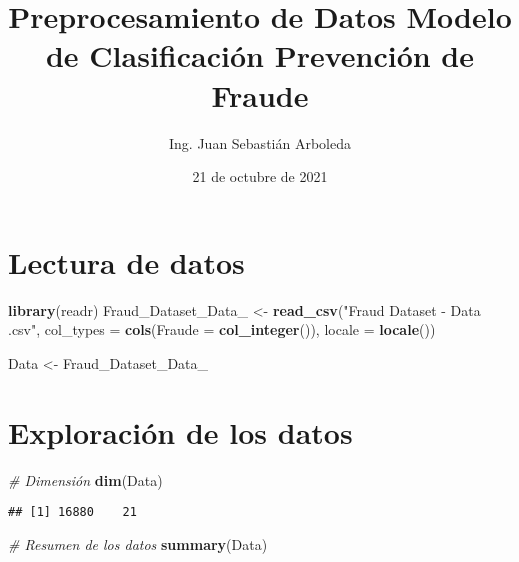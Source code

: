 \documentclass[]{article}
\title{Preprocesamiento de Datos Modelo de Clasificación Prevención de Fraude}
\author{Ing. Juan Sebastián Arboleda}
\date{21 de octubre de 2021}
\newenvironment{Shaded}{\begin{snugshade}}{\end{snugshade}}
\newcommand{\CommentTok}[1]{\textcolor[rgb]{0.56,0.35,0.01}{\textit{#1}}}
\newcommand{\DataTypeTok}[1]{\textcolor[rgb]{0.13,0.29,0.53}{#1}}
\newcommand{\KeywordTok}[1]{\textcolor[rgb]{0.13,0.29,0.53}{\textbf{#1}}}
\newcommand{\NormalTok}[1]{#1}
\newcommand{\StringTok}[1]{\textcolor[rgb]{0.31,0.60,0.02}{#1}}
\begin{document}
\maketitle

\hypertarget{lectura-de-datos}{%
\section{Lectura de datos}\label{lectura-de-datos}}

\begin{Shaded}
\begin{Highlighting}[]
\KeywordTok{library}\NormalTok{(readr)}
\NormalTok{Fraud_Dataset_Data_ <-}\StringTok{ }\KeywordTok{read_csv}\NormalTok{(}\StringTok{"Fraud Dataset  - Data .csv"}\NormalTok{, }
    \DataTypeTok{col_types =} \KeywordTok{cols}\NormalTok{(}\DataTypeTok{Fraude =} \KeywordTok{col_integer}\NormalTok{()), }
    \DataTypeTok{locale =} \KeywordTok{locale}\NormalTok{())}

\NormalTok{Data <-}\StringTok{ }\NormalTok{Fraud_Dataset_Data_}
\end{Highlighting}
\end{Shaded}

\hypertarget{exploraciuxf3n-de-los-datos}{%
\section{Exploración de los datos}\label{exploraciuxf3n-de-los-datos}}

\begin{Shaded}
\begin{Highlighting}[]
\CommentTok{# Dimensión}
\KeywordTok{dim}\NormalTok{(Data)}
\end{Highlighting}
\end{Shaded}

\begin{verbatim}
## [1] 16880    21
\end{verbatim}

\begin{Shaded}
\begin{Highlighting}[]
\CommentTok{# Resumen de los datos}
\KeywordTok{summary}\NormalTok{(Data)}
\end{Highlighting}
\end{Shaded}
\end{document}
